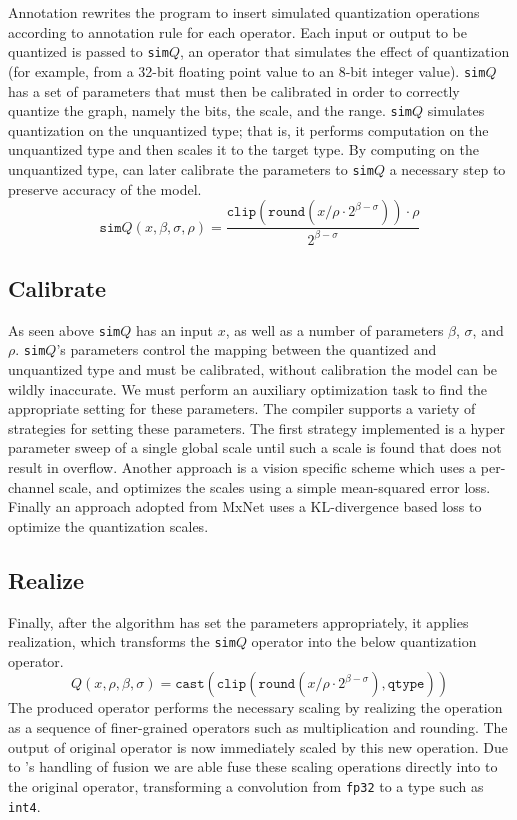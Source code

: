 Annotation rewrites the program to insert simulated quantization operations
  according to annotation rule for each operator.
Each input or output to be quantized is passed to \texttt{sim$Q$},
  an operator that simulates the effect of quantization (for example, from a 32-bit
  floating point value to an 8-bit integer value).
\texttt{sim$Q$} has a set of parameters that must then be calibrated in order to
  correctly quantize the graph, namely the bits, the scale, and the range.
\texttt{sim$Q$} simulates quantization on
  the unquantized type; that is, it performs computation on the unquantized type
  and then scales it to the target type.
By computing on the unquantized type, \relay can later calibrate the parameters to
  \texttt{sim$Q$} a necessary step to preserve accuracy of the model.
\vspace{-0.025in}
\[
  \texttt{sim$Q$}\left(x, \beta, \sigma, \rho\right) = \dfrac{\texttt{clip}\left(\texttt{round}\left(x / \rho \cdot 2^{\beta - \sigma}\right)\right) \cdot \rho}{2^{\beta - \sigma}}
\]
\subsection*{Calibrate}
As seen above \texttt{sim$Q$} has an input $x$, as well as a number of parameters
  $\beta$, $\sigma$, and $\rho$.
\texttt{sim$Q$}'s parameters control the mapping between the quantized and unquantized type
  and must be calibrated, without calibration the model can be wildly inaccurate.
We must perform an auxiliary optimization task to find the appropriate
  setting for these parameters.
The \relay compiler supports a variety of strategies for setting these
  parameters.
The first strategy implemented is a hyper parameter sweep of a
  single global scale until such a scale is found that does not result
  in overflow.
Another approach is a vision specific scheme which uses
  a per-channel scale, and optimizes the scales using a
  simple mean-squared error loss.
Finally an approach adopted from MxNet uses a
  KL-divergence based loss to optimize the
  quantization scales.

\subsection*{Realize}

Finally, after the algorithm has set the parameters appropriately,
  it applies realization,
  which transforms the \texttt{sim$Q$} operator into the below
  quantization operator.
\vspace{-0.05in}
\[
  Q\left(x, \rho, \beta, \sigma\right) = \texttt{cast}\left(\texttt{clip}\left(\texttt{round}\left(x / \rho \cdot 2^{\beta-\sigma}\right), \texttt{qtype}\right)\right)
\]
The produced operator performs the necessary scaling
  by realizing the operation as a sequence of finer-grained
  operators such as multiplication and rounding.
The output of original operator is now immediately scaled
  by this new operation.
Due to \relay's handling of fusion
  we are able fuse these scaling operations directly into
  to the original operator, transforming a convolution
  from \verb|fp32| to a type such as \verb|int4|.

